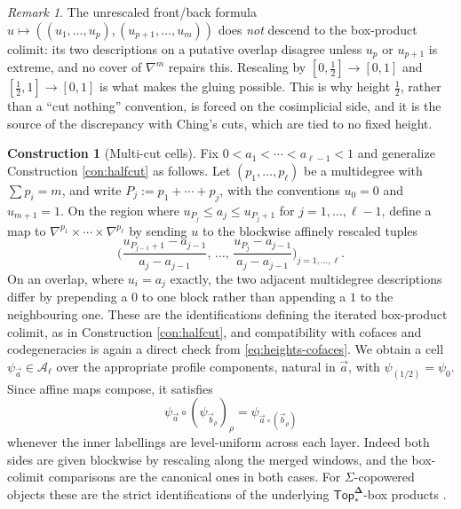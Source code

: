 \documentclass[12pt]{amsart}
\theoremstyle{definition}
\newtheorem{construction}[subsection]{Construction}
\theoremstyle{remark}
\newtheorem{remark}[subsection]{Remark}
\newcommand{\Top}{\mathsf{Top}_*}
\newcommand{\bdel}{\mathbf{\Delta}}
\newcommand{\Aop}{\mathcal{A}}                   %
\begin{document}
\begin{remark}\label{rem:naive-frontback-fails}
The unrescaled front/back formula $u\mapsto ((u_1,\dots,u_p),(u_{p+1},\dots,u_m))$ does \emph{not} descend to the box-product colimit: its two descriptions on a putative overlap disagree unless $u_{p}$ or $u_{p+1}$ is extreme, and no cover of $\nabla^m$ repairs this. Rescaling by $[0,\tfrac12]\to[0,1]$ and $[\tfrac12,1]\to [0,1]$ is what makes the gluing possible. This is why height $\tfrac12$, rather than a ``cut nothing'' convention, is forced on the cosimplicial side, and it is the source of the discrepancy with Ching's cuts, which are tied to no fixed height.
\end{remark}

\begin{construction}[Multi-cut cells]\label{con:multicut}
Fix $0 < a_1 < \cdots < a_{\ell-1} < 1$ and generalize Construction \ref{con:halfcut} as follows. Let $(p_1,\dots,p_\ell)$ be a multidegree with $\sum p_i = m$, and write $P_j := p_1+\cdots+p_j$, with the conventions $u_0 = 0$ and $u_{m+1}=1$. On the region where $u_{P_j}\leq a_j\leq u_{P_j + 1}$ for $j = 1,\dots,\ell-1$, define a map to $\nabla^{p_1}\times\cdots\times\nabla^{p_\ell}$ by sending $u$ to the blockwise affinely rescaled tuples
\[ \Big( \frac{u_{P_{j-1}+1} - a_{j-1}}{a_j - a_{j-1}},\, \dots,\, \frac{u_{P_j} - a_{j-1}}{a_j - a_{j-1}} \Big)_{j = 1,\dots,\ell}.\]
On an overlap, where $u_i = a_j$ exactly, the two adjacent multidegree descriptions differ by prepending a $0$ to one block rather than appending a $1$ to the neighbouring one. These are the identifications defining the iterated box-product colimit, as in Construction \ref{con:halfcut}, and compatibility with cofaces and codegeneracies is again a direct check from \eqref{eq:heights-cofaces}. We obtain a cell $\psi_{\vec a}\in \Aop_\ell$ over the appropriate profile components, natural in $\vec a$, with $\psi_{(1/2)} = \psi_0$. Since affine maps compose, it satisfies
\[ \psi_{\vec a}\circ (\psi_{\vec b_\rho})_\rho = \psi_{\vec a \circ (\vec b_\rho)} \]
whenever the inner labellings are level-uniform across each layer. Indeed both sides are given blockwise by rescaling along the merged windows, and the box-colimit comparisons are the canonical ones in both cases. For $\Sigma$-copowered objects these are the strict identifications of the underlying $\Top^{\bdel}$-box products \cite[\S 7]{Clark-1}.
\end{construction}
\end{document}
